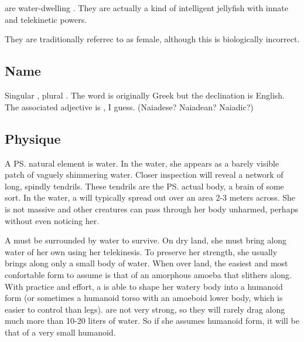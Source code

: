 \section{\Naiad}
\index{\naiad}
\Naiads{} are water-dwelling . 
They are actually a kind of intelligent jellyfish with innate  and telekinetic powers. 

They are traditionally referrec to as female, although this is biologically incorrect. 









\subsection{Name}
Singular \naiad, plural \emph{\naiads{}}. The word is originally Greek but the declination is English. The associated adjective is \emph{\naiad{}}, I guess. (Naiadese? Naiadean? Naiadic?) 









\subsection{Physique}
A \ps{\naiad}{} natural element is water. In the water, she appears as a barely visible patch of vaguely shimmering water. Closer inspection will reveal a network of long, spindly tendrils. These tendrils are the \ps{\naiad}{} actual body, a brain of some sort. In the water, a \naiad{} will typically spread out over an area 2-3 meters across. She is not massive and other creatures can pass through her body unharmed, perhaps without even noticing her. 

A \naiad{} must be surrounded by water to survive. On dry land, she must bring along water of her own using her telekinesis. To preserve her strength, she usually brings along only a small body of water. When \travelling over land, the easiest and most confortable form to assume is that of an amorphous amoeba that slithers along. With practice and effort, a \naiad{} is able to shape her watery body into a humanoid form (or sometimes a humanoid torso with an amoeboid lower body, which is easier to control than legs). \Naiads{} are not very strong, so they will rarely drag along much more than 10-20 liters of water. So if she assumes humanoid form, it will be that of a very small humanoid. 

